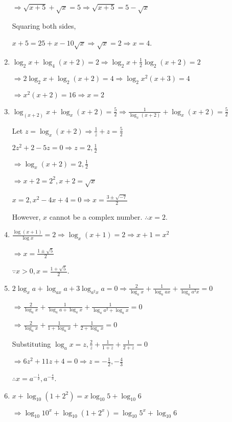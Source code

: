 \begin{enumerate}
  $\Rightarrow \sqrt{x + 5} + \sqrt{x} = 5 \Rightarrow \sqrt{x + 5} = 5 - \sqrt{x}$

  Squaring both sides,

  $x + 5 = 25 + x - 10\sqrt{x}\Rightarrow \sqrt{x} = 2\Rightarrow x = 4$.
\item $\log_2x + \log_4(x + 2) = 2 \Rightarrow \log_2x + \frac{1}{2}\log_2(x + 2) = 2$

  $\Rightarrow 2\log_2x + \log_2(x + 2) = 4 \Rightarrow \log_2x^2(x + 3) = 4$

  $\Rightarrow x^2(x + 2) = 16 \Rightarrow x = 2$
\item $\log_{(x + 2)}x + \log_x(x + 2) = \frac{5}{2} \Rightarrow \frac{1}{\log_x(x + 2)} + \log_x(x + 2) = \frac{5}{2}$

  Let $z = \log_x(x + 2) \Rightarrow \frac{1}{z} + z = \frac{5}{2}$

  $2z^2 + 2 - 5z = 0 \Rightarrow z = 2, \frac{1}{2}$

  $\Rightarrow \log_x(x + 2) = 2, \frac{1}{2}$

  $\Rightarrow x + 2 = 2^2, x + 2 = \sqrt{x}$

  $x = 2, x^2 - 4x + 4 = 0 \Rightarrow x = \frac{3\pm\sqrt{-7}}{2}$

  However, $x$ cannot be a complex number. $\therefore x = 2$.
\item $\frac{\log(x + 1)}{\log x} = 2\Rightarrow \log_x(x + 1) = 2 \Rightarrow x + 1 = x^2$

  $\Rightarrow x = \frac{1\pm \sqrt{5}}{2}$

  $\because x > 0, x = \frac{1 + \sqrt{5}}{2}$.
\item $2\log_xa + \log_{ax}a + 3\log_{a^2x}a = 0 \Rightarrow \frac{2}{\log_ax} + \frac{1}{\log_aax} + \frac{1}{\log_aa^2x} = 0$

  $\Rightarrow \frac{2}{\log_ax} + \frac{1}{\log_aa + \log_ax} + \frac{1}{\log_aa^2 + \log_ax} = 0$

  $\Rightarrow \frac{2}{\log_ax} + \frac{1}{1 + \log_ax} + \frac{1}{2 + \log_ax} = 0$

  Substituting $\log_ax = z, \frac{2}{z} + \frac{1}{1 + z} + \frac{1}{2 + z} = 0$

  $\Rightarrow 6z^2 + 11z + 4 = 0 \Rightarrow z = -\frac{1}{2}, -\frac{4}{3}$

  $\therefore x = a^{-\tfrac{1}{2}}, a^{-\tfrac{4}{3}}$.
\item $x + \log_{10}(1 + 2^2) = x\log_{10}5 + \log_{10}6$

  $\Rightarrow \log_{10}10^x + \log_{10}(1 + 2^x) = \log_{10}5^x + \log_{10}6$


\end{enumerate}
